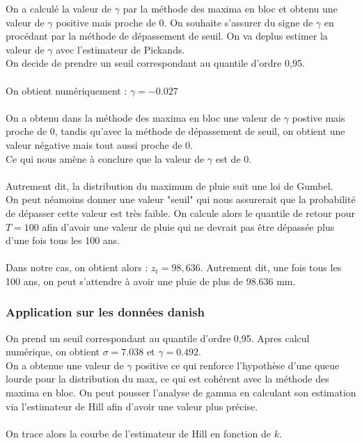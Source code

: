 \documentclass{article}
\theoremstyle{plain}
\theoremstyle{definition}
\theoremstyle{plain}
\begin{document}
On a calculé la valeur de $\gamma$ par la méthode des maxima en bloc et obtenu une valeur de $\gamma $ positive mais proche de 0. On souhaite s'assurer du signe de $\gamma$
en procédant par la méthode de dépassement de seuil. On va deplus estimer la valeur de $\gamma$ avec l'estimateur de Pickands.
\\
On decide de prendre un seuil correspondant au quantile d’ordre 0,95.
\\
\\
On obtient numériquement : 
$\gamma  = -0.027$
\\
\\
On a obtenu dans la méthode des maxima en bloc une valeur de $\gamma$ postive mais proche de 0,
tandis qu'avec la méthode de dépassement de seuil, on obtient une valeur négative mais tout aussi proche de 0.
\\
Ce qui nous amène à conclure que la valeur de $\gamma$ est de 0.
\\
\\
Autrement dit, la distribution du maximum de pluie suit une loi de Gumbel.
\\
On peut néamoins donner une valeur "seuil" qui nous assurerait que la probabilité de dépasser cette valeur est très faible. 
On calcule alors le quantile de retour pour $T=100$ afin d'avoir une valeur de pluie qui ne devrait pas être dépassée plus d'une fois tous les 100 ans.
\\
\\
Dans notre cas, on obtient alors : $z_t = 98,636$. Autrement dit, une fois tous les 100 ans, on peut s'attendre à avoir une pluie de plus de 98.636 mm.

\subsubsection{Application sur les données danish}

On prend un seuil correspondant au quantile d’ordre 0,95. Apres calcul numérique, on obtient $\sigma = 7.038$ et $\gamma = 0.492$.
\\
On a obtenue une valeur de $\gamma$ positive ce qui renforce l'hypothèse d'une queue lourde pour la distribution du max, ce qui est cohérent avec la méthode des maxima en bloc. On peut pousser l'analyse de gamma en calculant son estimation via l'estimateur de Hill afin d'avoir une valeur plus précise.
\\
\\
On trace alors la courbe de l'estimateur de Hill en fonction de $k$.
\end{document}

